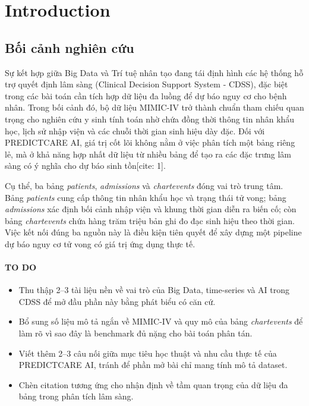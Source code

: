 \section{Introduction}

\subsection{Bối cảnh nghiên cứu}
Sự kết hợp giữa Big Data và Trí tuệ nhân tạo đang tái định hình các hệ thống hỗ trợ quyết định lâm sàng (Clinical Decision Support System - CDSS), đặc biệt trong các bài toán cần tích hợp dữ liệu đa luồng để dự báo nguy cơ cho bệnh nhân. Trong bối cảnh đó, bộ dữ liệu MIMIC-IV trở thành chuẩn tham chiếu quan trọng cho nghiên cứu y sinh tính toán nhờ chứa đồng thời thông tin nhân khẩu học, lịch sử nhập viện và các chuỗi thời gian sinh hiệu dày đặc. Đối với PREDICTCARE AI, giá trị cốt lõi không nằm ở việc phân tích một bảng riêng lẻ, mà ở khả năng hợp nhất dữ liệu từ nhiều bảng để tạo ra các đặc trưng lâm sàng có ý nghĩa cho dự báo sinh tồn[cite: 1].

Cụ thể, ba bảng \textit{patients}, \textit{admissions} và \textit{chartevents} đóng vai trò trung tâm. Bảng \textit{patients} cung cấp thông tin nhân khẩu học và trạng thái tử vong; bảng \textit{admissions} xác định bối cảnh nhập viện và khung thời gian diễn ra biến cố; còn bảng \textit{chartevents} chứa hàng trăm triệu bản ghi đo đạc sinh hiệu theo thời gian. Việc kết nối đúng ba nguồn này là điều kiện tiên quyết để xây dựng một pipeline dự báo nguy cơ tử vong có giá trị ứng dụng thực tế.

\paragraph{TO DO}
\begin{itemize}
    \item Thu thập 2--3 tài liệu nền về vai trò của Big Data, time-series và AI trong CDSS để mở đầu phần này bằng phát biểu có căn cứ.
    \item Bổ sung số liệu mô tả ngắn về MIMIC-IV và quy mô của bảng \textit{chartevents} để làm rõ vì sao đây là benchmark đủ nặng cho bài toán phân tán.
    \item Viết thêm 2--3 câu nối giữa mục tiêu học thuật và nhu cầu thực tế của PREDICTCARE AI, tránh để phần mở bài chỉ mang tính mô tả dataset.
    \item Chèn citation tương ứng cho nhận định về tầm quan trọng của dữ liệu đa bảng trong phân tích lâm sàng.
\end{itemize}

